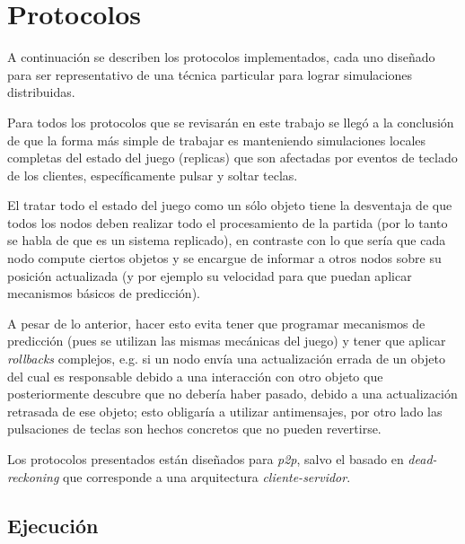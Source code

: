 \section{Protocolos}





A continuación se describen los protocolos implementados, cada uno diseñado para ser representativo de una técnica particular para lograr simulaciones distribuidas.

Para todos los protocolos que se revisarán en este trabajo se llegó a la conclusión de que la forma más simple de trabajar es manteniendo simulaciones locales completas del estado del juego (replicas) que son afectadas por eventos de teclado de los clientes, específicamente pulsar y soltar teclas.

El tratar todo el estado del juego como un sólo objeto tiene la desventaja de que todos los nodos deben realizar todo el procesamiento de la partida (por lo tanto se habla de que es un sistema replicado), en contraste con lo que sería que cada nodo compute ciertos objetos y se encargue de informar a otros nodos sobre su posición actualizada (y por ejemplo su velocidad para que puedan aplicar mecanismos básicos de predicción).

A pesar de lo anterior, hacer esto evita tener que programar mecanismos de predicción (pues se utilizan las mismas mecánicas del juego) y tener que aplicar \emph{rollbacks} complejos, e.g. si un nodo envía una actualización errada de un objeto del cual es responsable debido a una interacción con otro objeto que posteriormente descubre que no debería haber pasado, debido a una actualización retrasada de ese objeto; esto obligaría a utilizar antimensajes, por otro lado las pulsaciones de teclas son hechos concretos que no pueden revertirse.

Los protocolos presentados están diseñados para \emph{p2p}, salvo el basado en \emph{dead-reckoning} que corresponde a una arquitectura \emph{cliente-servidor}.

\subsection{Ejecución}

